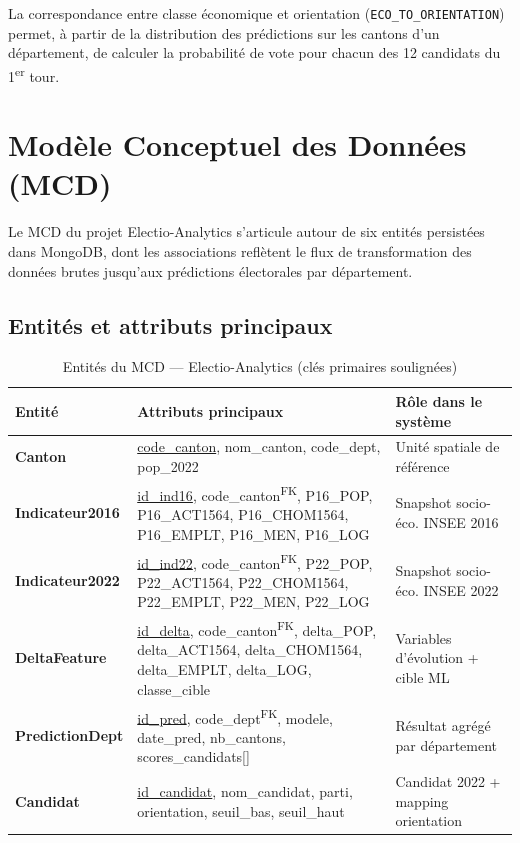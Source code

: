 \noindent La correspondance entre classe économique et orientation (\texttt{ECO\_TO\_ORIENTATION})
permet, à partir de la distribution des prédictions sur les cantons d'un département,
de calculer la probabilité de vote pour chacun des 12 candidats du 1\textsuperscript{er} tour.

\section{Modèle Conceptuel des Données (MCD)}

Le MCD du projet Electio-Analytics s'articule autour de six entités persistées dans
MongoDB, dont les associations reflètent le flux de transformation des données brutes
jusqu'aux prédictions électorales par département.

\subsection*{Entités et attributs principaux}

\begin{table}[H]
\centering
\caption{Entités du MCD — Electio-Analytics (clés primaires soulignées)}
\label{tab:mcd_entites}
\begin{tabular}{p{3cm}p{7.5cm}p{3.5cm}}
\toprule
\textbf{Entité} & \textbf{Attributs principaux} & \textbf{Rôle dans le système} \\
\midrule
\textbf{Canton}
  & \underline{code\_canton}, nom\_canton, code\_dept, pop\_2022
  & Unité spatiale de référence \\[4pt]
\textbf{Indicateur2016}
  & \underline{id\_ind16}, code\_canton\textsuperscript{FK},
    P16\_POP, P16\_ACT1564, P16\_CHOM1564, P16\_EMPLT, P16\_MEN, P16\_LOG
  & Snapshot socio-éco. INSEE 2016 \\[4pt]
\textbf{Indicateur2022}
  & \underline{id\_ind22}, code\_canton\textsuperscript{FK},
    P22\_POP, P22\_ACT1564, P22\_CHOM1564, P22\_EMPLT, P22\_MEN, P22\_LOG
  & Snapshot socio-éco. INSEE 2022 \\[4pt]
\textbf{DeltaFeature}
  & \underline{id\_delta}, code\_canton\textsuperscript{FK},
    delta\_POP, delta\_ACT1564, delta\_CHOM1564, delta\_EMPLT,
    delta\_LOG, classe\_cible
  & Variables d'évolution + cible ML \\[4pt]
\textbf{PredictionDept}
  & \underline{id\_pred}, code\_dept\textsuperscript{FK}, modele,
    date\_pred, nb\_cantons, scores\_candidats[]
  & Résultat agrégé par département \\[4pt]
\textbf{Candidat}
  & \underline{id\_candidat}, nom\_candidat, parti, orientation,
    seuil\_bas, seuil\_haut
  & Candidat 2022 + mapping orientation \\
\bottomrule
\end{tabular}
\end{table}

